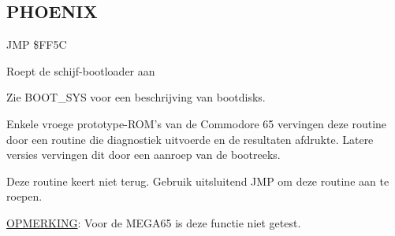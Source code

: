 
\newpage
\subsection{PHOENIX}
\label{KERNAL Jump Table!PHOENIX}
\begin{description}[leftmargin=2cm,style=nextline]
    \item [Adres:] JMP \$FF5C    \item [Omschrijving:] Roept de schijf-bootloader aan    \item [Opmerkingen:]        Zie BOOT\_SYS voor een beschrijving van bootdisks.

        Enkele vroege prototype-ROM's van de Commodore 65 vervingen deze routine door een routine die diagnostiek uitvoerde en de resultaten afdrukte. Latere versies vervingen dit door een aanroep van de bootreeks.

        Deze routine keert niet terug. Gebruik uitsluitend JMP om deze routine aan te roepen.

        \underline{OPMERKING}: Voor de MEGA65 is deze functie niet getest.

    \item [Voorbeeld:]

\end{description}



\newpage
